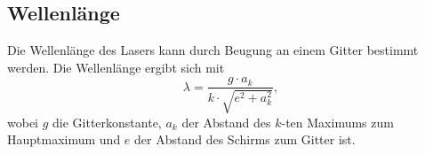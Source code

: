 \subsection{Wellenlänge}\label{sec:wellenlaenge}
Die Wellenlänge des Lasers kann durch Beugung an einem Gitter bestimmt werden. Die Wellenlänge ergibt sich mit
\begin{equation*}
    \label{eqn:wel}
    \lambda = \frac{g \cdot a_k}{k \cdot \sqrt{e^2 + a_k^2}},
\end{equation*}
wobei $g$ die Gitterkonstante, $a_k$ der Abstand des $k$-ten Maximums zum Hauptmaximum und $e$ der Abstand des Schirms zum Gitter ist.\\
\newpage
